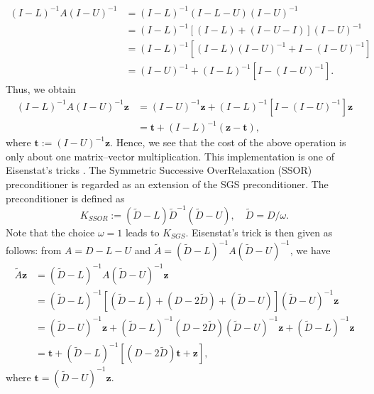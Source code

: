 \[\begin{aligned}(I-L)^{-1}A(I-U)^{-1}&=(I-L)^{-1}(I-L-U)(I-U)^{-1}\\
&=(I-L)^{-1}[(I-L)+(I-U-I)](I-U)^{-1}\\
&=(I-L)^{-1}[(I-L)(I-U)^{-1}+I-(I-U)^{-1}]\\
&=(I-U)^{-1}+(I-L)^{-1}[I-(I-U)^{-1}].\end{aligned}\]
{Thus, we obtain}
\[\begin{aligned}(I-L)^{-1}A(I-U)^{-1}\bm z&=(I-U)^{-1}\bm z+(I-L)^{-1}[I-(I-U)^{-1}]\bm z\\&=\bm t+(I-L)^{-1}(\bm z-\bm t),\end{aligned}\]
{where $\bm t:=(I-U)^{-1}\bm z$. Hence, we see that the cost of the above operation is only about one matrix--vector multiplication. This implementation is one of Eisenstat's tricks .}
{The Symmetric Successive OverRelaxation (SSOR) preconditioner is regarded as an extension of the SGS preconditioner. The preconditioner is defined as}
\[K_{SSOR}:=(\widetilde D-L)\widetilde D^{-1}(\widetilde D-U),\quad\widetilde D=D/\omega.\]
{Note that the choice $\omega=1$ leads to $K_{SGS}$. Eisenstat's trick is then given as follows: from $A=D-L-U$ and $\widetilde A=(\widetilde D-L)^{-1}A(\widetilde D-U)^{-1}$, we have}
\[\begin{aligned}\widetilde A\bm z&=(\widetilde D-L)^{-1}A(\widetilde D-U)^{-1}\bm z\\
&=(\widetilde D-L)^{-1}[(\widetilde D-L)+(D-2\widetilde D)+(\widetilde D-U)](\widetilde D-U)^{-1}\bm z\\
&=(\widetilde D-U)^{-1}\bm z+(\widetilde D-L)^{-1}(D-2\widetilde D)(\widetilde D-U)^{-1}\bm z+(\widetilde D-L)^{-1}\bm z\\
&=\bm t+(\widetilde D-L)^{-1}[(D-2\widetilde D)\bm t+\bm z],\end{aligned}\]
{where $\bm t=(\widetilde D-U)^{-1}\bm z$.}
